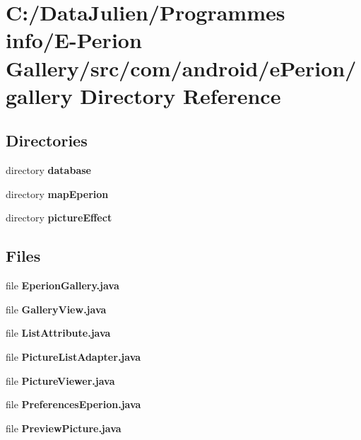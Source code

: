 \section{C\-:/\-Data\-Julien/\-Programmes info/\-E-\/\-Perion Gallery/src/com/android/e\-Perion/gallery Directory Reference}
\label{dir_fdfe3b4f770bed334c63e1f42e4889da}
\subsection*{Directories}
\begin{DoxyCompactItemize}
\item 
directory {\bf database}
\item 
directory {\bf map\-Eperion}
\item 
directory {\bf picture\-Effect}
\end{DoxyCompactItemize}
\subsection*{Files}
\begin{DoxyCompactItemize}
\item 
file {\bfseries Eperion\-Gallery.\-java}
\item 
file {\bfseries Gallery\-View.\-java}
\item 
file {\bfseries List\-Attribute.\-java}
\item 
file {\bfseries Picture\-List\-Adapter.\-java}
\item 
file {\bfseries Picture\-Viewer.\-java}
\item 
file {\bfseries Preferences\-Eperion.\-java}
\item 
file {\bfseries Preview\-Picture.\-java}
\end{DoxyCompactItemize}

